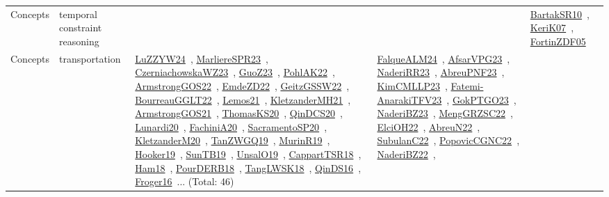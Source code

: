 {\begin{longtable}{lp{3cm}>{\raggedright\arraybackslash}p{6cm}>{\raggedright\arraybackslash}p{6cm}>{\raggedright\arraybackslash}p{8cm}}
\index{temporal constraint reasoning}\index{Concepts!temporal constraint reasoning}Concepts & temporal constraint reasoning &  &  & \href{../works/BartakSR10.pdf}{BartakSR10}~\cite{BartakSR10}, \href{../works/KeriK07.pdf}{KeriK07}~\cite{KeriK07}, \href{../works/FortinZDF05.pdf}{FortinZDF05}~\cite{FortinZDF05}\\
\index{transportation}\index{Concepts!transportation}Concepts & transportation & \href{../works/LuZZYW24.pdf}{LuZZYW24}~\cite{LuZZYW24}, \href{../works/MarliereSPR23.pdf}{MarliereSPR23}~\cite{MarliereSPR23}, \href{../works/CzerniachowskaWZ23.pdf}{CzerniachowskaWZ23}~\cite{CzerniachowskaWZ23}, \href{../works/GuoZ23.pdf}{GuoZ23}~\cite{GuoZ23}, \href{../works/PohlAK22.pdf}{PohlAK22}~\cite{PohlAK22}, \href{../works/ArmstrongGOS22.pdf}{ArmstrongGOS22}~\cite{ArmstrongGOS22}, \href{../works/EmdeZD22.pdf}{EmdeZD22}~\cite{EmdeZD22}, \href{../works/GeitzGSSW22.pdf}{GeitzGSSW22}~\cite{GeitzGSSW22}, \href{../works/BourreauGGLT22.pdf}{BourreauGGLT22}~\cite{BourreauGGLT22}, \href{../works/Lemos21.pdf}{Lemos21}~\cite{Lemos21}, \href{../works/KletzanderMH21.pdf}{KletzanderMH21}~\cite{KletzanderMH21}, \href{../works/ArmstrongGOS21.pdf}{ArmstrongGOS21}~\cite{ArmstrongGOS21}, \href{../works/ThomasKS20.pdf}{ThomasKS20}~\cite{ThomasKS20}, \href{../works/QinDCS20.pdf}{QinDCS20}~\cite{QinDCS20}, \href{../works/Lunardi20.pdf}{Lunardi20}~\cite{Lunardi20}, \href{../works/FachiniA20.pdf}{FachiniA20}~\cite{FachiniA20}, \href{../works/SacramentoSP20.pdf}{SacramentoSP20}~\cite{SacramentoSP20}, \href{../works/KletzanderM20.pdf}{KletzanderM20}~\cite{KletzanderM20}, \href{../works/TanZWGQ19.pdf}{TanZWGQ19}~\cite{TanZWGQ19}, \href{../works/MurinR19.pdf}{MurinR19}~\cite{MurinR19}, \href{../works/Hooker19.pdf}{Hooker19}~\cite{Hooker19}, \href{../works/SunTB19.pdf}{SunTB19}~\cite{SunTB19}, \href{../works/UnsalO19.pdf}{UnsalO19}~\cite{UnsalO19}, \href{../works/CappartTSR18.pdf}{CappartTSR18}~\cite{CappartTSR18}, \href{../works/Ham18.pdf}{Ham18}~\cite{Ham18}, \href{../works/PourDERB18.pdf}{PourDERB18}~\cite{PourDERB18}, \href{../works/TangLWSK18.pdf}{TangLWSK18}~\cite{TangLWSK18}, \href{../works/QinDS16.pdf}{QinDS16}~\cite{QinDS16}, \href{../works/Froger16.pdf}{Froger16}~\cite{Froger16}... (Total: 46) & \href{../works/FalqueALM24.pdf}{FalqueALM24}~\cite{FalqueALM24}, \href{../works/AfsarVPG23.pdf}{AfsarVPG23}~\cite{AfsarVPG23}, \href{../works/NaderiRR23.pdf}{NaderiRR23}~\cite{NaderiRR23}, \href{../works/AbreuPNF23.pdf}{AbreuPNF23}~\cite{AbreuPNF23}, \href{../works/KimCMLLP23.pdf}{KimCMLLP23}~\cite{KimCMLLP23}, \href{../works/Fatemi-AnarakiTFV23.pdf}{Fatemi-AnarakiTFV23}~\cite{Fatemi-AnarakiTFV23}, \href{../works/GokPTGO23.pdf}{GokPTGO23}~\cite{GokPTGO23}, \href{../works/NaderiBZ23.pdf}{NaderiBZ23}~\cite{NaderiBZ23}, \href{../works/MengGRZSC22.pdf}{MengGRZSC22}~\cite{MengGRZSC22}, \href{../works/ElciOH22.pdf}{ElciOH22}~\cite{ElciOH22}, \href{../works/AbreuN22.pdf}{AbreuN22}~\cite{AbreuN22}, \href{../works/SubulanC22.pdf}{SubulanC22}~\cite{SubulanC22}, \href{../works/PopovicCGNC22.pdf}{PopovicCGNC22}~\cite{PopovicCGNC22}, \href{../works/NaderiBZ22.pdf}{NaderiBZ22}~\cite{NaderiBZ22}, 
\end{longtable}}
